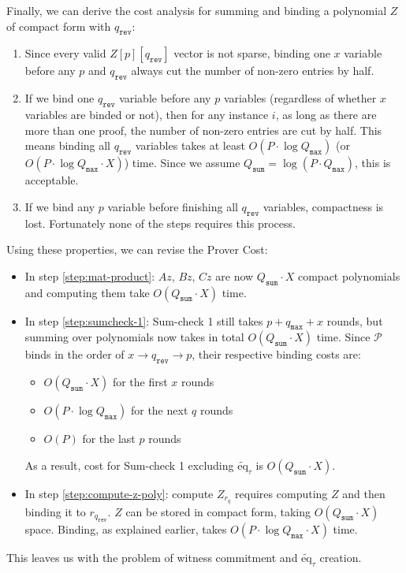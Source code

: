 \documentclass{article}
\newcommand{\Qsum}{Q_{\mathtt{sum}}}
\newcommand{\Qmax}{Q_{\mathtt{max}}}
\newcommand{\qmax}{q_{\mathtt{max}}}
\newcommand{\qrev}{q_{\mathtt{rev}}}
\renewcommand{\P}{\mathcal{P}}
\newcommand{\eq}{\widetilde{\mbox{eq}}}
\begin{document}
Finally, we can derive the cost analysis for summing and binding a polynomial $Z$ of compact form with $\qrev$:
\begin{enumerate}
    \item Since every valid $Z[p][\qrev]$ vector is not sparse, binding one $x$ variable before any $p$ and $\qrev$ always cut the number of non-zero entries by half.
    \item If we bind one $\qrev$ variable before any $p$ variables (regardless of whether $x$ variables are binded or not), then for any instance $i$, as long as there are more than one proof, the number of non-zero entries are cut by half. This means binding all $\qrev$ variables takes at least $O(P \cdot \log \Qmax)$ (or $O(P \cdot \log \Qmax\cdot X)$) time. Since we assume $\Qsum = \log (P\cdot \Qmax)$, this is acceptable.
    \item If we bind any $p$ variable before finishing all $\qrev$ variables, compactness is lost. Fortunately none of the steps requires this process.
\end{enumerate}
Using these properties, we can revise the Prover Cost:
\begin{itemize}
    \item In step \ref{step:mat-product}: $Az$, $Bz$, $Cz$ are now $\Qsum \cdot X$ compact polynomials and computing them take $O(\Qsum \cdot X)$ time.
    \item In step \ref{step:sumcheck-1}: Sum-check 1 still takes $p + \qmax + x$ rounds, but summing over polynomials now takes in total $O(\Qsum \cdot X)$ time. Since $\P$ binds in the order of $x \to \qrev \to p$, their respective binding costs are:
    \begin{itemize}
        \item $O(\Qsum \cdot X)$ for the first $x$ rounds
        \item $O(P \cdot \log \Qmax)$ for the next $q$ rounds
        \item $O(P)$ for the last $p$ rounds
    \end{itemize}
    As a result, cost for Sum-check 1 excluding $\eq_\tau$ is $O(\Qsum \cdot X)$.
    \item In step \ref{step:compute-z-poly}: compute $Z_{r_q}$ requires computing $Z$ and then binding it to $r_{\qrev}$. $Z$ can be stored in compact form, taking $O(\Qsum \cdot X)$ space. Binding, as explained earlier, takes $O(P \cdot \log \Qmax\cdot X)$ time.
\end{itemize}
This leaves us with the problem of witness commitment and $\eq_\tau$ creation.
\end{document}
